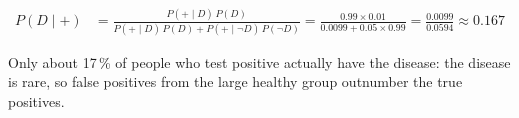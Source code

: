 \begin{formulas}
\begin{align*}
P(D \mid +) &= \frac{P(+ \mid D)\,P(D)}{P(+ \mid D)\,P(D) + P(+ \mid \neg D)\,P(\neg D)}
  = \frac{0.99 \times 0.01}{0.0099 + 0.05 \times 0.99} = \frac{0.0099}{0.0594} \approx 0.167
\end{align*}
\end{formulas}
\noindent Only about 17\,\% of people who test positive actually have the disease: the disease is rare, so false
positives from the large healthy group outnumber the true positives.
